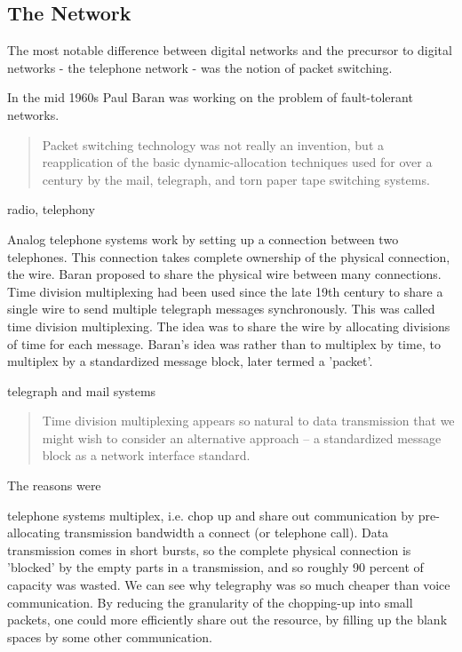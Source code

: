\subsection{The Network}

The most notable difference between digital networks and the precursor to digital networks - the
telephone network - was the notion of packet switching.


In the mid 1960s Paul Baran was working on the problem of fault-tolerant networks\cite{baran1964intro}.

\begin{quote}
Packet switching technology was not really an invention, but a reapplication of the basic
    dynamic-allocation techniques used for over a century by the mail, telegraph, and torn paper
    tape switching systems. \cite{roberts1978}
\end{quote}


radio, telephony

Analog telephone systems work by setting up a connection between two telephones. This connection
takes complete ownership of the physical connection, the wire. Baran proposed to share the physical
wire between many connections. Time division multiplexing had been used since the late 19th century
to share a single wire to send multiple telegraph messages synchronously. This was called time
division multiplexing. The idea was to share the wire by allocating divisions of time for each
message. Baran's idea was rather than to multiplex by time, to multiplex by a standardized message
block, later termed a 'packet'.


telegraph and mail systems

\begin{quote}
Time division multiplexing appears so natural to data transmission that we might wish to consider an
alternative approach -- a standardized message block as a network interface standard.\cite{baran1964intro}
\end{quote}

The reasons were


telephone systems multiplex, i.e. chop up and share out communication by pre-allocating transmission
bandwidth a connect (or telephone call). Data transmission comes in short bursts, so the complete
physical connection is 'blocked' by the empty parts in a transmission, and so roughly 90 percent of
capacity was wasted. We can see why telegraphy was so much cheaper than voice communication. By
reducing the granularity of the chopping-up into small packets, one could more efficiently share out
the resource, by filling up the blank spaces by some other communication.

